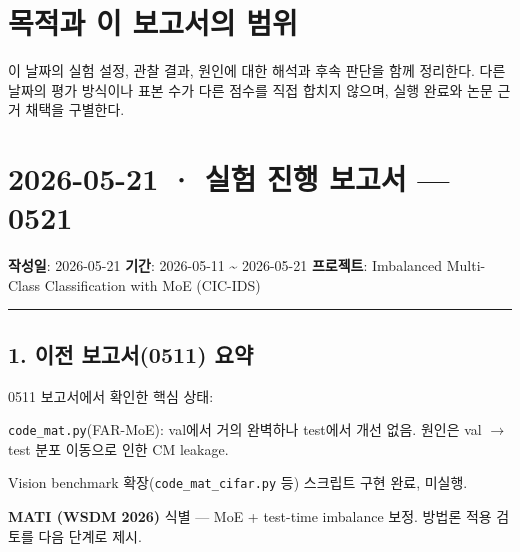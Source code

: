 




\section*{목적과 이 보고서의 범위}

이 날짜의 실험 설정, 관찰 결과, 원인에 대한 해석과 후속 판단을 함께 정리한다. 다른 날짜의 평가 방식이나 표본 수가 다른 점수를 직접 합치지 않으며, 실행 완료와 논문 근거 채택을 구별한다.


\section{2026-05-21 · 실험 진행 보고서 — 0521}
\label{report:20260521_0521}
\textbf{작성일}: 2026-05-21 \textbf{기간}: 2026-05-11 \textasciitilde{} 2026-05-21 \textbf{프로젝트}: Imbalanced Multi-Class Classification with MoE (CIC-IDS)


\medskip\hrule\medskip
\subsection{1. 이전 보고서(0511) 요약}
0511 보고서에서 확인한 핵심 상태:

\par\noindent \textbullet\enspace \texttt{code\_\allowbreak{}\allowbreak{}mat\allowbreak{}.\allowbreak{}py}(FAR-MoE): val에서 거의 완벽하나 test에서 개선 없음. 원인은 val \ensuremath{\rightarrow} test 분포 이동으로 인한 CM leakage.


\par\noindent \textbullet\enspace Vision benchmark 확장(\texttt{code\_\allowbreak{}\allowbreak{}mat\allowbreak{}\_\allowbreak{}\allowbreak{}cifar.\allowbreak{}p\allowbreak{}y} 등) 스크립트 구현 완료, 미실행.


\par\noindent \textbullet\enspace \textbf{MATI (WSDM 2026)} 식별 — MoE +\allowbreak{} test-time imbalance 보정. 방법론 적용 검토를 다음 단계로 제시.



